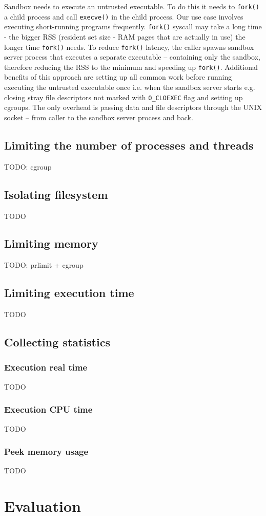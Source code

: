 \documentclass[licencjacka,en]{pracamgr}
\begin{document}
Sandbox needs to execute an untrusted executable. To do this it needs to \texttt{fork()} a child process and call \texttt{execve()} in the child process. Our use case involves executing short-running programs frequently. \texttt{fork()} syscall may take a long time \cite{redis-latency-generated-by-fork} - the bigger RSS (resident set size - RAM pages that are actually in use) the longer time \texttt{fork()} needs. To reduce \texttt{fork()} latency, the caller spawns sandbox server process that executes a separate executable -- containing only the sandbox, therefore reducing the RSS to the minimum and speeding up \texttt{fork()}. Additional benefits of this approach are setting up all common work before running executing the untrusted executable once i.e. when the sandbox server starts e.g. closing stray file descriptors not marked with \texttt{O\_CLOEXEC} flag and setting up cgroups. The only overhead is passing data and file descriptors through the UNIX socket -- from caller to the sandbox server process and back.

\section{Limiting the number of processes and threads}
TODO: cgroup

\section{Isolating filesystem}
TODO

\section{Limiting memory}
TODO: prlimit + cgroup

\section{Limiting execution time}
TODO

\section{Collecting statistics}

\subsection{Execution real time}
TODO

\subsection{Execution CPU time}
TODO

\subsection{Peek memory usage}
TODO


\chapter{Evaluation} \label{chapter:evaluation}

\printbibliography
\end{document}
